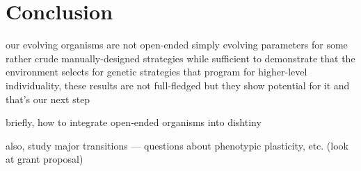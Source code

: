 \section{Conclusion}

our evolving organisms are not open-ended
simply evolving parameters for some rather crude manually-designed strategies
while sufficient to demonstrate that the environment selects for genetic strategies that program for higher-level individuality, these results are not full-fledged
but they show potential for it and that's our next step

briefly, how to integrate open-ended organisms into dishtiny

also, study major transitions --- questions about phenotypic plasticity, etc. (look at grant proposal)
